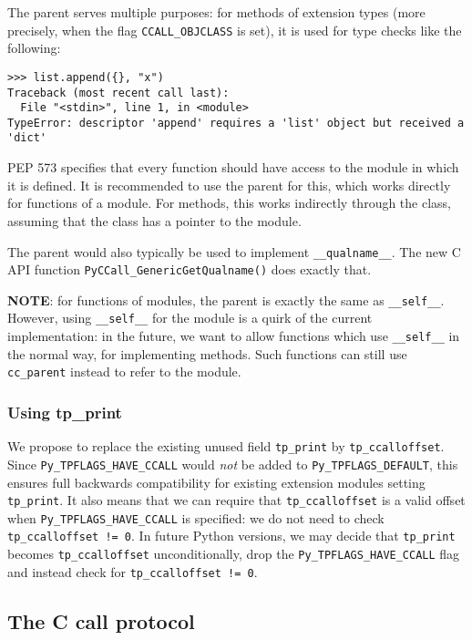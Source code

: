 The parent serves multiple purposes: for methods of extension types
(more precisely, when the flag \texttt{CCALL\_OBJCLASS} is set), it is
used for type checks like the following:

\begin{verbatim}
>>> list.append({}, "x")
Traceback (most recent call last):
  File "<stdin>", line 1, in <module>
TypeError: descriptor 'append' requires a 'list' object but received a 'dict'
\end{verbatim}

PEP 573 specifies that every function should have access to the module
in which it is defined. It is recommended to use the parent for this,
which works directly for functions of a module. For methods, this works
indirectly through the class, assuming that the class has a pointer to
the module.

The parent would also typically be used to implement
\texttt{\_\_qualname\_\_}. The new C API function
\texttt{PyCCall\_GenericGetQualname()} does exactly that.

\textbf{NOTE}: for functions of modules, the parent is exactly the same
as \texttt{\_\_self\_\_}. However, using \texttt{\_\_self\_\_} for the
module is a quirk of the current implementation: in the future, we want
to allow functions which use \texttt{\_\_self\_\_} in the normal way,
for implementing methods. Such functions can still use
\texttt{cc\_parent} instead to refer to the module.

\subsubsection{Using tp\_print}

We propose to replace the existing unused field \texttt{tp\_print} by
\texttt{tp\_ccalloffset}. Since \texttt{Py\_TPFLAGS\_HAVE\_CCALL} would
\emph{not} be added to \texttt{Py\_TPFLAGS\_DEFAULT}, this ensures full
backwards compatibility for existing extension modules setting
\texttt{tp\_print}. It also means that we can require that
\texttt{tp\_ccalloffset} is a valid offset when
\texttt{Py\_TPFLAGS\_HAVE\_CCALL} is specified: we do not need to check
\texttt{tp\_ccalloffset\ !=\ 0}. In future Python versions, we may
decide that \texttt{tp\_print} becomes \texttt{tp\_ccalloffset}
unconditionally, drop the \texttt{Py\_TPFLAGS\_HAVE\_CCALL} flag and
instead check for \texttt{tp\_ccalloffset\ !=\ 0}.

\subsection{The C call protocol}

